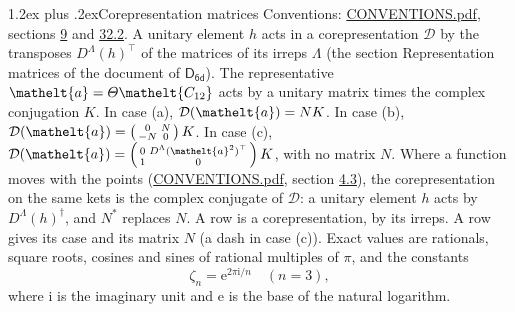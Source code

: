 \documentclass[10pt,a4paper]{article}
\makeatletter
\renewcommand\section{\@startsection{section}{1}{\z@}{-3ex plus -1ex minus -.2ex}%
  {1.2ex plus .2ex}{\normalfont\large\sffamily\bfseries\color{parttitle}}}
\numberwithin{equation}{section}
\newcommand{\eltfont}[1]{{\let\sigma\eltsigma\mathelt{#1}}}
\newcommand{\grp}[1]{\mathsf{#1}}
\newcommand{\elt}[1]{\eltfont{#1}}
\newcommand{\iunit}{\mathrm{i}}
\newcommand{\expe}{\mathrm{e}}
\newcommand{\rootunity}[1]{\zeta_{#1}}
\makeatother
\begin{document}
\section{Corepresentation matrices}\label{s:corep_matrices}
Conventions: \href{../../CONVENTIONS.pdf}{CONVENTIONS.pdf}, sections \href{../../../rotation/CONVENTIONS.pdf\#conv.9}{9} and \href{../../CONVENTIONS.pdf\#conv.32.2}{32.2}.
A unitary element $h$ acts in a corepresentation $\mathcal{D}$ by the transposes $D^{\Lambda}(h)^{\top}$ of the matrices of its irreps $\Lambda$ (the section Representation matrices of the document of \href{../../../rotation/data/pdf/D6d.pdf}{$\grp{D_{6d}}$}). The representative $\elt{a} = \varTheta\elt{C_{12}}$ acts by a unitary matrix times the complex conjugation $K$.
In case (a), $\mathcal{D}(\elt{a}) = NK$. In case (b), $\mathcal{D}(\elt{a}) = \left(\begin{smallmatrix} 0 & N \\ -N & 0 \end{smallmatrix}\right) K$. In case (c), $\mathcal{D}(\elt{a}) = \left(\begin{smallmatrix} 0 & D^{\Lambda}(\elt{a}^2)^{\top} \\ 1 & 0 \end{smallmatrix}\right) K$, with no matrix $N$.
Where a function moves with the points (\href{../../CONVENTIONS.pdf}{CONVENTIONS.pdf}, section \href{../../../rotation/CONVENTIONS.pdf\#conv.4.3}{4.3}), the corepresentation on the same kets is the complex conjugate of $\mathcal{D}$: a unitary element $h$ acts by $D^{\Lambda}(h)^{\dagger}$, and $N^{*}$ replaces $N$.
A row is a corepresentation, by its irreps. A row gives its case and its matrix $N$ (a dash in case (c)).
\leavevmode\label{n:constant.root}\label{n:index.root.order}Exact values are rationals, square roots, cosines and sines of rational multiples of $\pi$, and the constants
\begin{equation}\label{e:constants}\rootunity{n} = \expe^{2\pi\iunit/n}\quad(n = 3),\end{equation}
where $\iunit$ is the imaginary unit and $\expe$ is the base of the natural logarithm.
\end{document}
